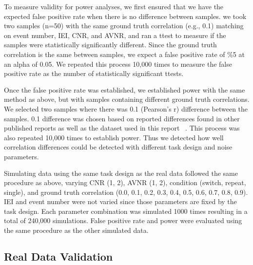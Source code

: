 \documentclass[10pt,letterpaper]{article}
\begin{document}
To measure validity for power analyses, we first ensured that we have
the expected false positive rate when there is no difference between samples.
we took two samples (n=50) with the same ground truth correlation (e.g., 0.1)
matching on event number, IEI, CNR, and AVNR, and ran a ttest to measure if the samples
were statistically significantly different.
Since the ground truth correlation is the same between samples,
we expect a false positive rate of \%5 at an alpha of 0.05.
We repeated this process 10,000 times to measure the false positive rate as
the number of statistically significant ttests.

Once the false positive rate was established, we established power with the same method as above,
but with samples containing different ground truth correlations.
We selected two samples where there was 0.1 (Pearson's r) difference between the samples.
0.1 difference was chosen based on reported differences found in other published
reports as well as the dataset used in this report ~\cite{Katsura2014,Lee2017,Turner2017,Lin2019,Huang2019}.
This process was also repeated 10,000 times to establish power.
Thus we detected how well correlation differences could be detected
with different task design and noise parameters.

Simulating data using the same task design as the real data followed the same
procedure as above, varying CNR (1, 2), AVNR (1, 2), condition (switch, repeat, single),
and ground truth correlation (0.0, 0.1, 0.2, 0.3, 0.4, 0.5, 0.6, 0.7, 0.8, 0.9).
IEI and event number were not varied since those parameters are fixed by the
task design.
Each parameter combination was simulated 1000 times resulting in a total of 240,000 simulations.
False positive rate and power were evaluated using the same procedure as the other simulated data.

\subsection*{Real Data Validation}
\label{methods:task-switch}
\end{document}
